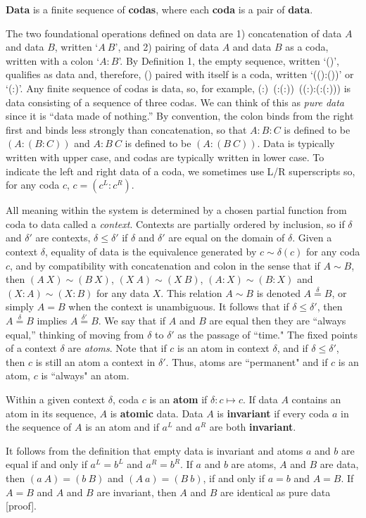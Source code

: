 \documentclass[11pt]{article}
\begin{document}
\begin{definition} {{\bf Data} is a finite sequence of {\bf codas}, where each {\bf coda} is a pair of {\bf data}.}
\end{definition}

\noindent The two foundational operations defined on data are 1) concatenation of data $A$ and data $B$, written `$A\ B$', and 2) pairing of data $A$ and data $B$ as a coda, written with a colon `$A:B$'.   
By Definition 1, the empty sequence, written `()', qualifies as data and, therefore, () paired with itself is a coda, written `(():())' or `(:)'.  
Any finite sequence of codas is data, so, for example, (:)\ (:(:))\ ((:):(:(:))) is  
data consisting of a sequence of three codas.  We can think of this as {\it pure data} since it is ``data made of nothing.''  
By convention, the colon binds from the right first and binds less strongly than concatenation, so that $A:B:C$ is defined to be $(A:(B:C))$ and $A:B\ C$ is defined to be $(A:(B\ C))$.  
Data is typically written with upper case, and codas are typically written in lower case.  
To indicate the left and right data of a coda, we sometimes use L/R superscripts so, for any coda $c$, $c=(c^L:c^R)$. 

     All meaning within the system is determined by a chosen partial function from coda to data called a {\it context}. 
Contexts are partially ordered by inclusion, so if $\delta$ and $\delta'$ are contexts, $\delta\le\delta'$ if $\delta$ and $\delta'$ are equal on the domain of $\delta$.  
Given a context $\delta$, equality of data is the equivalence generated by $c\sim \delta(c)$ for any coda $c$, and by compatibility with concatenation and colon in the sense that 
if $A\sim B$, then $(A\ X)\sim (B\ X)$, $(X\ A)\sim (X\ B)$, $(A:X)\sim (B:X)$ and $(X:A)\sim(X:B)$ for any data $X$.  This relation $A\sim B$ is denoted $A{\overset\delta =}B$, 
or simply $A=B$ when the context is unambiguous.   
It follows that if $\delta\leq\delta'$, then $A{\overset\delta =}B$ implies $A{\overset{\delta'} =}B$.  We say that if $A$ and $B$ are equal then they are ``always equal,'' thinking 
of moving from $\delta$ to $\delta'$ as the passage of ``time."  The fixed points of a context $\delta$ are {\it atoms}.  Note that if $c$ is an atom in context $\delta$, 
and if $\delta\leq\delta'$, then $c$ is still an atom a context in $\delta'$.  Thus, atoms are ``permanent" and if $c$ is an atom, $c$ is ``always" an atom.  

\begin{definition}
{Within a given context $\delta$, coda $c$ is an {\bf atom} if $\delta:c\mapsto c$.  If data $A$ contains an atom in its sequence, $A$ is {\bf atomic} data. 
Data $A$ is {\bf invariant} if every coda $a$ in the sequence of $A$ is an atom and if $a^L$ and $a^R$ are both {\bf invariant}. }
\end{definition}
\noindent It follows from the definition that empty data is invariant and atoms $a$ and $b$ are equal if and only if $a^L=b^L$ and $a^R=b^R$.  If $a$ and $b$ are atoms, 
$A$ and $B$ are data, then $(a\ A)=(b\ B)$ and $(A\ a)=(B\ b)$, if and only if $a=b$ and $A=B$.  If $A=B$ and $A$ and $B$ are invariant, then $A$ and 
$B$ are identical as pure data [proof].
\end{document}
